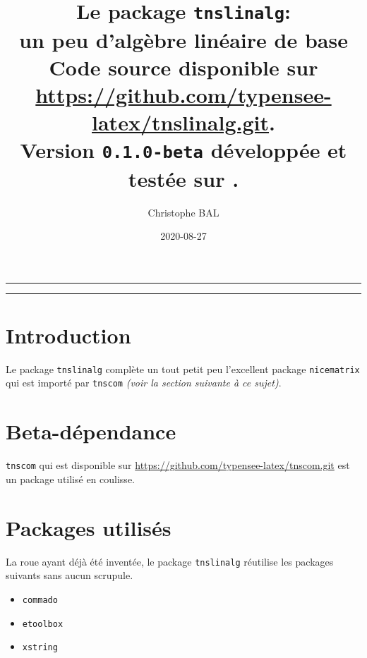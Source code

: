 \documentclass[12pt,a4paper]{article}
\theoremstyle{definition}
\begin{document}
\renewcommand\labelitemi{\raisebox{0.125em}{\tiny\textbullet}}
\renewcommand{\labelitemii}{---}

\title{  %
	Le package \texttt{tnslinalg}:\\%
	un peu d'algèbre linéaire de base\\%
	{\footnotesize Code source disponible sur \url{https://github.com/typensee-latex/tnslinalg.git}.}\\%
{\footnotesize Version \texttt{0.1.0-beta} développée et testée sur \macosxname{}.}%
}
\author{Christophe BAL}
\date{2020-08-27}

\maketitle


\vspace{2em}

\hrule

\tableofcontents

\vspace{1.5em}

\hrule

\newpage

\section{Introduction}

Le package \verb+tnslinalg+ complète un tout petit peu l'excellent package \verb+nicematrix+ qui est importé par \verb#tnscom# \emph{(voir la section suivante à ce sujet)}.


\section{Beta-dépendance}

\verb#tnscom# qui est disponible sur \url{https://github.com/typensee-latex/tnscom.git} est un package utilisé en coulisse.
\section{Packages utilisés}

La roue ayant déjà été inventée, le package \verb#tnslinalg# réutilise les packages suivants sans aucun scrupule.

\begin{multicols}{4}
    \begin{itemize}
        \item \verb#commado#
        \item \verb#etoolbox#
        \item \verb#xstring#
    \end{itemize}
\end{multicols}
\end{document}

